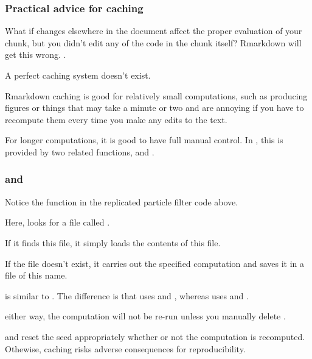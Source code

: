 \documentclass{beamer}\usepackage[]{graphicx}\usepackage[]{color}
\begin{document}
\begin{frame}[fragile]
\frametitle{Practical advice for caching}
\bi
\item  What if changes elsewhere in the document affect the proper evaluation of your chunk, but you didn't edit any of the code in the chunk itself?
Rmarkdown will get this wrong. .

\item  A perfect caching system doesn't exist. 

\item  Rmarkdown caching is good for relatively small computations, such as producing figures or things that may take a minute or two and are annoying if you have to recompute them every time you make any edits to the text.

\item  For longer computations, it is good to have full manual control. In , this is provided by two related functions,  and .

\ei

\end{frame}

\begin{frame}[fragile]

\frametitle{ and }
\bi
\item  Notice the function  in the replicated particle filter code above.

\item  Here,  looks for a file called . 

\item  If it finds this file, it simply loads the contents of this file.

\item  If the file doesn't exist, it carries out the specified computation and saves it in a file of this name.

\item  {} is similar to . The difference is that  uses  and , whereas  uses  and . 

\item  either way, the computation will not be re-run unless you manually delete .

\item  {} and  reset the seed appropriately whether or not the computation is recomputed. Othewise, caching risks adverse consequences for reproducibility.

\ei

\end{frame}   
\end{document}
